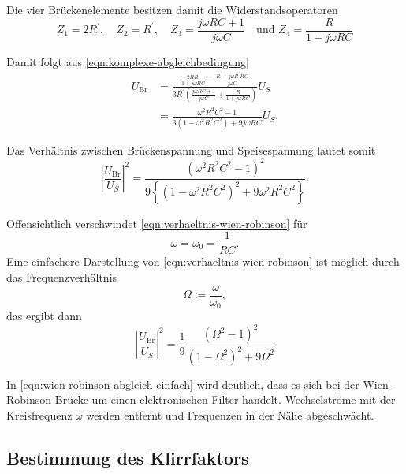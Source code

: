 Die vier Brückenelemente besitzen damit die Widerstandsoperatoren
\begin{equation}
	Z_1 = 2R^\prime,
	\quad
	Z_2 = R^\prime,
	\quad
	Z_3 = \frac{j\omega RC + 1}{j \omega C}
	\quad
	\text{und }
	Z_4 = \frac{R}{1 + j\omega RC}
\end{equation}

Damit folgt aus \autoref{eqn:komplexe-abgleichbedingung}
\begin{align}
	U_\text{Br} 
	&= \frac{
		\frac{2 R R^\prime}{1 + j\omega RC}
		- \frac{R^\prime + j \omega R^\prime RC}{j\omega C}
	}
	{3 R^\prime \left(\frac{j \omega RC +1}{j\omega C}
			+ \frac{R}{1 + j \omega RC}
		\right)
	}
	U_S
	\\
	&= \frac{\omega^2 R^2 C^2 - 1}
	{3 \left(1 - \omega^2 R^2C^2\right) + 9 j\omega RC}
	U_S.
\end{align}

Das Verhältnis zwischen Brückenspannung und Speisespannung lautet somit
\begin{equation}
	\left|\frac{U_\text{Br}}{U_S}\right|^2
	=
	\frac{\left(\omega^2R^2C^2 - 1 \right)^2}
	{9 \left\{ \left(1 - \omega^2R^2C^2\right)^2 + 9\omega^2R^2C^2 \right\}}.
	\label{eqn:verhaeltnis-wien-robinson}
\end{equation}

Offensichtlich verschwindet \autoref{eqn:verhaeltnis-wien-robinson} für
\begin{equation}
	\omega = \omega_0 = \frac{1}{RC}.
	\label{eqn:wien-robinson-w0}
\end{equation}
Eine einfachere Darstellung von \autoref{eqn:verhaeltnis-wien-robinson} ist möglich durch
das Frequenzverhältnis
\begin{equation}
	\Omega := \frac{\omega}{\omega_0},
	\label{eqn:wien-robinson-frequenz}
\end{equation}
das ergibt dann
\begin{equation}
	\left|\frac{U_\text{Br}}{U_S}\right|^2
	=
	\frac{1}{9}
	\frac{\left(\Omega^2 - 1\right)^2}{\left(1 - \Omega^2\right)^2 + 9\Omega^2}
	\label{eqn:wien-robinson-abgleich-einfach}
\end{equation}

In \autoref{eqn:wien-robinson-abgleich-einfach} wird deutlich, dass es sich bei der 
Wien-Robinson-Brücke um einen elektronischen Filter handelt. Wechselströme mit der 
Kreisfrequenz $\omega$ werden entfernt und Frequenzen in der Nähe abgeschwächt.

\subsection{Bestimmung des Klirrfaktors}
\label{sec:klirrfaktor}


